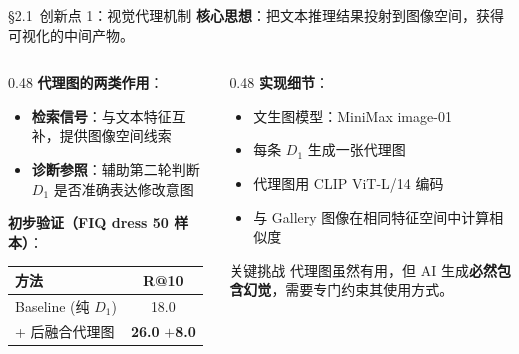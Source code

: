 \documentclass[aspectratio=169,12pt]{beamer}
\newcommand{\up}[1]{\textcolor{tongjiRed}{\textbf{$+$#1}}}
\begin{document}
\begin{frame}{\S2.1~创新点 1：视觉代理机制}
\textbf{核心思想}：把文本推理结果投射到图像空间，获得可视化的中间产物。

\vspace{0.5em}
\begin{columns}[T]
\begin{column}{0.48\textwidth}
\textbf{代理图的两类作用}：
\begin{itemize}\small
  \item \textbf{检索信号}：与文本特征互补，提供图像空间线索
  \item \textbf{诊断参照}：辅助第二轮判断 $D_1$ 是否准确表达修改意图
\end{itemize}

\vspace{0.5em}
\textbf{初步验证（FIQ dress 50 样本）}：
\begin{center}\small
\begin{tabular}{lc}
\toprule
方法 & R@10 \\
\midrule
Baseline (纯 $D_1$) & 18.0 \\
+ 后融合代理图 & \textbf{26.0} \up{8.0}\\
\bottomrule
\end{tabular}
\end{center}
\end{column}
\begin{column}{0.48\textwidth}
\textbf{实现细节}：
\begin{itemize}\small
  \item 文生图模型：MiniMax image-01
  \item 每条 $D_1$ 生成一张代理图
  \item 代理图用 CLIP ViT-L/14 编码
  \item 与 Gallery 图像在相同特征空间中计算相似度
\end{itemize}

\vspace{0.5em}
\begin{alertblock}{\small 关键挑战}
\small 代理图虽然有用，但 AI 生成\textbf{必然包含幻觉}，需要专门约束其使用方式。
\end{alertblock}
\end{column}
\end{columns}
\end{frame}
\end{document}
